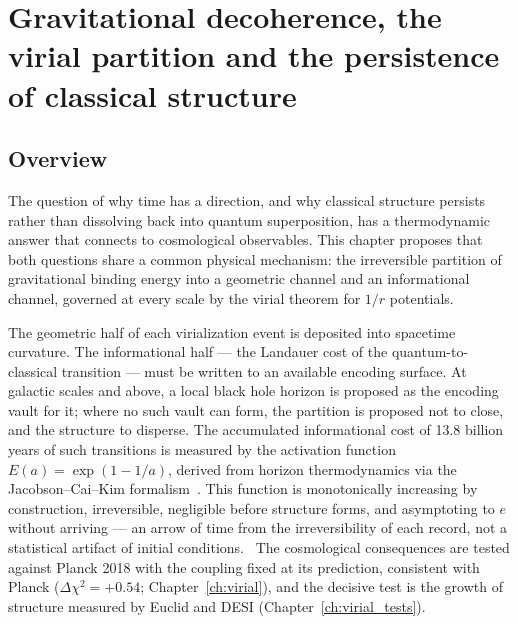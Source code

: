 
\chapter{Gravitational decoherence, the virial partition and the persistence of classical structure}\label{ch:virial_decoherence}

\section*{Overview}
The question of why time has a direction, and why classical structure persists rather than dissolving back into quantum superposition, has a thermodynamic
answer that connects to cosmological observables. This chapter proposes that both questions share a common physical mechanism: the irreversible partition of
gravitational binding energy into a geometric channel and an informational channel, governed at every scale by the virial theorem for $1/r$ potentials.
\conjecture

The geometric half of each virialization event is deposited into spacetime curvature. The informational half --- the Landauer cost of the
quantum-to-classical transition --- must be written to an available encoding surface. At galactic scales and above, a local black hole horizon is proposed
as the encoding vault for it; where no such vault can form, the partition is proposed not to close, and the structure to disperse. The accumulated
informational cost of 13.8 billion years of such transitions is measured by the activation function $E(a)=\exp(1-1/a)$, derived from horizon
thermodynamics via the Jacobson--Cai--Kim formalism~\cite{Jacobson1995,CaiKim2005}. This function is monotonically increasing by construction, irreversible,
negligible before structure forms, and asymptoting to $e$ without arriving --- an arrow of time from the irreversibility of each record, not a statistical
artifact of initial conditions. \interp\ The cosmological consequences are tested against Planck 2018 with the coupling fixed at its prediction, consistent
with Planck ($\Delta\chi^2=+0.54$; Chapter~\ref{ch:virial}), and the decisive test is the growth of structure measured by Euclid and DESI
(Chapter~\ref{ch:virial_tests}).

